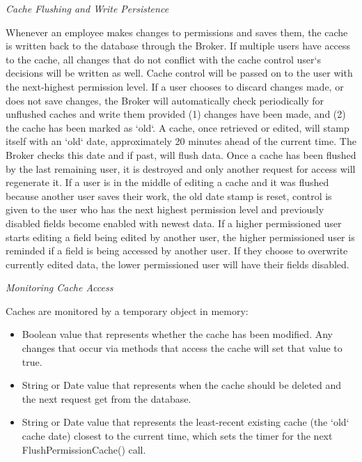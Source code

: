 \documentclass[letterpaper,12pt]{report}
\begin{document}
{\begin{description}
	  \par \noindent
	  \textit{Cache Flushing and Write Persistence}
	  \par \noindent \hspace*{1cm} Whenever an employee makes changes to permissions and saves them, the cache is written back to the database through the Broker. If multiple users have access to the cache, all changes that do not conflict with the cache control user`s decisions will be written as well. Cache control will be passed on to the user with the next-highest permission level. If a user chooses to discard changes made, or does not save changes, the Broker will automatically check periodically for unflushed caches and write them provided (1) changes have been made, and (2) the cache has been marked as `old`. A cache, once retrieved or edited, will stamp itself with an `old` date, approximately 20 minutes ahead of the current time. The Broker checks this date and if past, will flush data. Once a cache has been flushed by the last remaining user, it is destroyed and only another request for access will regenerate it. If a user is in the middle of editing a cache and it was flushed because another user saves their work, the old date stamp is reset, control is given to the user who has the next highest permission level and previously disabled fields become enabled with newest data. If a higher permissioned user starts editing a field being edited by another user, the higher permissioned user is reminded if a field is being accessed by another user. If they choose to overwrite currently edited data, the lower permissioned user will have their fields disabled.
	  \par \noindent
	  \textit{Monitoring Cache Access}
	  \par \noindent \hspace*{1cm} Caches are monitored by a temporary object in memory:
	  \begin{itemize}
	   \item Boolean value that represents whether the cache has been modified. Any changes that occur via methods that access the cache will set that value to true.
	   \item String or Date value that represents when the cache should be deleted and the next request get from the database.
	   \item String or Date value that represents the least-recent existing cache (the `old` cache date) closest to the current time, which sets the timer for the next FlushPermissionCache() call.
	  \end{itemize}


\end{description}}
\end{document}

